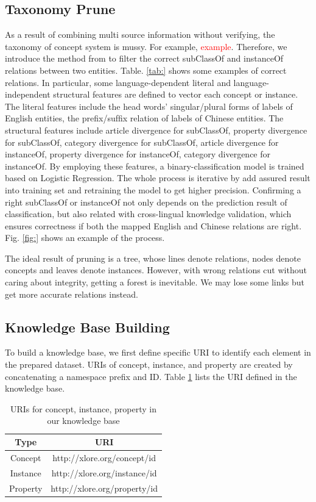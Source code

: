 \documentclass[runningheads,a4paper]{llncs}
\begin{document}
\subsection{Taxonomy Prune}
\label{sec:tp}
As a result of combining multi source information without verifying, the taxonomy of concept system is mussy. For example, \textcolor{red}{example}. Therefore, we introduce the method from\cite{wang2014cross} to filter the correct subClassOf and instanceOf relations between two entities. Table. \ref{tab:} shows some examples of correct relations. In particular, some language-dependent literal and language-independent structural features are defined to vector each concept or instance. The literal features include the head words’ singular/plural forms of labels of English entities, the preﬁx/sufﬁx relation of labels of Chinese entities. The structural features include article divergence for subClassOf, property divergence for subClassOf, category divergence for subClassOf, article divergence for instanceOf, property divergence for instanceOf, category divergence for instanceOf. By employing these features, a binary-classification model is trained based on Logistic Regression. The whole process is iterative by add assured result into training set and retraining the model to get higher precision. Confirming a right subClassOf or instanceOf not only depends on the prediction result of classification, but also related with cross-lingual knowledge validation, which ensures correctness if both the mapped English and Chinese relations are right. Fig. \ref{fig:} shows an example of the process.

The ideal result of pruning is a tree, whose lines denote relations, nodes denote concepts and leaves denote instances. However, with wrong relations cut without caring about integrity, getting a forest is inevitable. We may lose some links but get more accurate relations instead.

\subsection{Knowledge Base Building}
To build a knowledge base, we first define specific URI to identify each element in the prepared dataset. URIs of concept, instance, and property are created by concatenating a namespace prefix and ID. Table \ref{tab:uris} lists the URI defined in the knowledge base.
\begin{table}[h]
\small
\centering
\caption{URIs for concept, instance, property in our knowledge base}
\label{tab:uris}
    \begin{tabular}{|c|c|}
        \hline
        Type     & URI                          \\ \hline
        Concept  & http://xlore.org/concept/id  \\ \hline
        Instance & http://xlore.org/instance/id \\ \hline
        Property & http://xlore.org/property/id \\ \hline
    \end{tabular}
\end{table}
\end{document}
